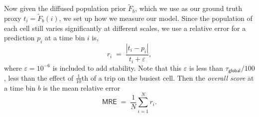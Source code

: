 \documentclass[sigconf, review]{acmart}
\newcommand{\NFG}{\tau_{\textsf{global}}}
\begin{document}
Now given the diffused population prior $\tilde F_b$, which we use as our ground truth proxy $t_i = \tilde F_b(i)$, we set up how we measure our model.  Since the population of each cell still varies significantly at different scales, we use a relative error for a prediction $p_i$ at a time bin $i$ is, 
\[
r_i \;=\; \frac{|t_i - p_i|}{t_i + \varepsilon},
\]
where $\varepsilon = 10^{-6}$ is included to add stability.  Note that this $\varepsilon$ is less than $\NFG/100$, less than the effect of $\frac{1}{10}$th of a trip on the busiest cell.  
Then the \emph{overall score} at a time bin $b$ is the mean relative error
\[
\textsf{MRE} \;=\; \frac{1}{N} \sum_{i = 1}^{N} r_i.
\]






\end{document}
